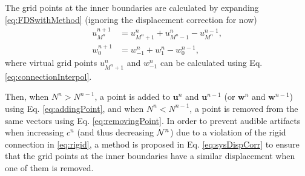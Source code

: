 The grid points at the inner boundaries are calculated by expanding \eqref{eq:FDSwithMethod} (ignoring the displacement correction for now)
\begin{subequations}\label{eq:innerboundariesExpanded}
    \begin{align}
        u_{M^n}^{n+1} &= u_{{M^n}+1}^n + u_{{M^n}-1}^n - u_{M^n}^{n-1},\\
        w_0^{n+1} &= w_{-1}^n + w_{1}^n - w_0^{n-1},
    \end{align}
\end{subequations}
%
where virtual grid points $u_{{M^n}+1}^n$ and $w_{-1}^n$ can be calculated using Eq. \eqref{eq:connectionInterpol}.

Then, when $ N^n > N^{n-1}$, a point is added to $\mathbf{u}^n$ and $\mathbf{u}^{n-1}$ (or $\mathbf{w}^n$ and $\mathbf{w}^{n-1}$) using Eq. \eqref{eq:addingPoint}, and when $ N^n  < N^{n-1}$, a point is removed from the same vectors using Eq. \eqref{eq:removingPoint}. In order to prevent audible artifacts when increasing $c^n$ (and thus decreasing $\mathcal{N}^n$) due to a violation of the rigid connection in \eqref{eq:rigid}, a method is proposed in Eq. \eqref{eq:sysDispCorr} to ensure that the grid points at the inner boundaries have a similar displacement when one of them is removed. 

